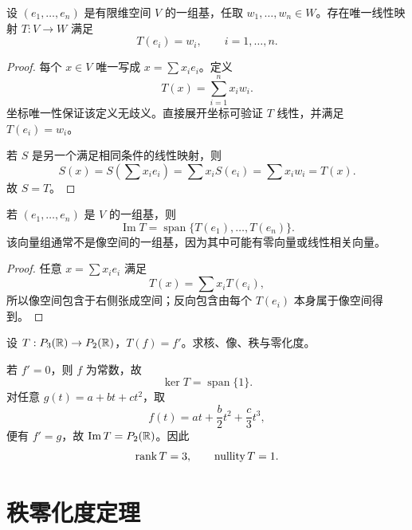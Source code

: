 \begin{theorem}[基上赋值的线性延拓]
\leavevmode\par\noindent
设 $(e_1,\ldots,e_n)$ 是有限维空间 $V$ 的一组基，任取 $w_1,\ldots,w_n\in W$。存在唯一线性映射 $T:V\to W$ 满足
\[
T(e_i)=w_i,\qquad i=1,\ldots,n.
\]
\end{theorem}
\begin{proof}
每个 $x\in V$ 唯一写成 $x=\sum x_ie_i$。定义
\[
T(x)=\sum_{i=1}^n x_iw_i.
\]
坐标唯一性保证该定义无歧义。直接展开坐标可验证 $T$ 线性，并满足 $T(e_i)=w_i$。

若 $S$ 是另一个满足相同条件的线性映射，则
\[
S(x)=S\left(\sum x_ie_i\right)
=\sum x_iS(e_i)=\sum x_iw_i=T(x).
\]
故 $S=T$。
\end{proof}

\begin{corollary}[基的像生成像空间]
若 $(e_1,\ldots,e_n)$ 是 $V$ 的一组基，则
\[
\operatorname{Im}T
=\operatorname{span}\{T(e_1),\ldots,T(e_n)\}.
\]
该向量组通常不是像空间的一组基，因为其中可能有零向量或线性相关向量。
\end{corollary}
\begin{proof}
任意 $x=\sum x_ie_i$ 满足
\[
T(x)=\sum x_iT(e_i),
\]
所以像空间包含于右侧张成空间；反向包含由每个 $T(e_i)$ 本身属于像空间得到。
\end{proof}

\begin{example}[title={求核、像与秩}]
设 $T:P_3(\mathbb{R})\to P_2(\mathbb{R})$，$T(f)=f'$。求核、像、秩与零化度。
\begin{solution}
若 $f'=0$，则 $f$ 为常数，故
\[
\ker T=\operatorname{span}\{1\}.
\]
对任意 $g(t)=a+bt+ct^2$，取
\[
f(t)=at+\frac b2t^2+\frac c3t^3,
\]
便有 $f'=g$，故 $\operatorname{Im}T=P_2(\mathbb{R})$。因此
\[
\operatorname{rank} T=3,\qquad \operatorname{nullity}T=1.
\]
\end{solution}
\end{example}

\section{秩零化度定理}

